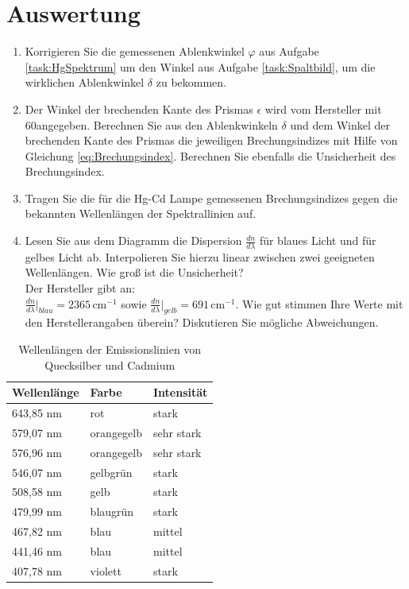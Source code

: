 \section{Auswertung} 
\begin{enumerate}
%
 \item Korrigieren Sie die gemessenen Ablenkwinkel $\varphi$ aus Aufgabe \ref{task:HgSpektrum} um den Winkel aus Aufgabe \ref{task:Spaltbild}, um die wirklichen Ablenkwinkel $\delta$ zu bekommen.
 \item Der Winkel der brechenden Kante des Prismas $\epsilon$ wird vom Hersteller mit 60\degree angegeben. Berechnen Sie aus den Ablenkwinkeln $\delta$ und dem Winkel der brechenden Kante des Prismas die jeweiligen Brechungsindizes mit Hilfe von Gleichung \ref{eq:Brechungsindex}. Berechnen Sie ebenfalls die Unsicherheit des Brechungsindex.
 \item Tragen Sie die für die Hg-Cd Lampe gemessenen Brechungsindizes gegen die bekannten Wellenlängen der Spektrallinien auf.
 \item Lesen Sie aus dem Diagramm die Dispersion $\frac{dn}{d\lambda}$ für blaues Licht und für gelbes Licht ab. Interpolieren Sie hierzu linear zwischen zwei geeigneten Wellenlängen. Wie groß ist die Unsicherheit?\\
	Der Hersteller gibt an:\\
	$\frac{dn}{d\lambda}|_{blau} = 2365\,\mathrm{cm^{-1}}$ sowie $\frac{dn}{d\lambda}|_{gelb} = 691\,\mathrm{cm^{-1}}$. Wie gut stimmen Ihre Werte mit den Herstellerangaben überein? Diskutieren Sie mögliche Abweichungen.
\end{enumerate}


\begin{table}[hb]
	\centering
		\begin{tabular}{lll}
			\hline
			Wellenlänge & Farbe & Intensität\\
			\hline
			643,85 nm & rot & stark\\
			579,07 nm & orangegelb & sehr stark\\
			576,96 nm & orangegelb & sehr stark\\
			546,07 nm & gelbgrün & stark\\
			508,58 nm & gelb & stark\\
			479,99 nm & blaugrün & stark\\
			467,82 nm & blau & mittel\\
			441,46 nm & blau & mittel\\
			407,78 nm & violett & stark\\
			\hline
		\end{tabular}
	\caption{Wellenlängen der Emissionslinien von Quecksilber und Cadmium}
	\label{tab:Wellenlaengen}
\end{table}

